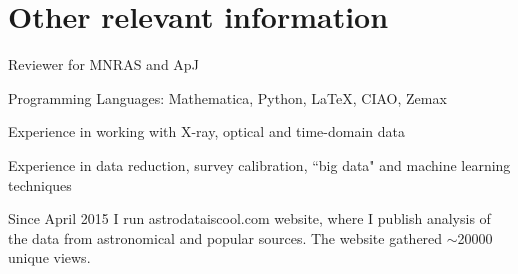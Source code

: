 \documentclass[11pt,letterpaper]{article}
\renewenvironment{itemize}{
  \begin{list}{}{
    \setlength{\leftmargin}{1.5em}
    \setlength{\itemsep}{0.15em}
    \setlength{\parskip}{0pt}
    \setlength{\parsep}{0.25em}
  }
}{
  \end{list}
}
\begin{document}
\section*{Other relevant information}

\begin{itemize}
\item Reviewer for MNRAS and  ApJ
\item Programming Languages: Mathematica, Python, \LaTeX, CIAO, Zemax
\item Experience in working with X-ray, optical and time-domain data
 \item Experience in data reduction, survey calibration, ``big data" and machine learning techniques
\item Since April 2015 I run astrodataiscool.com website, where I publish analysis of the data from \hbox{astronomical} and popular sources. The website gathered $\sim$20000 unique views. 
\end{itemize}


\end{document}
